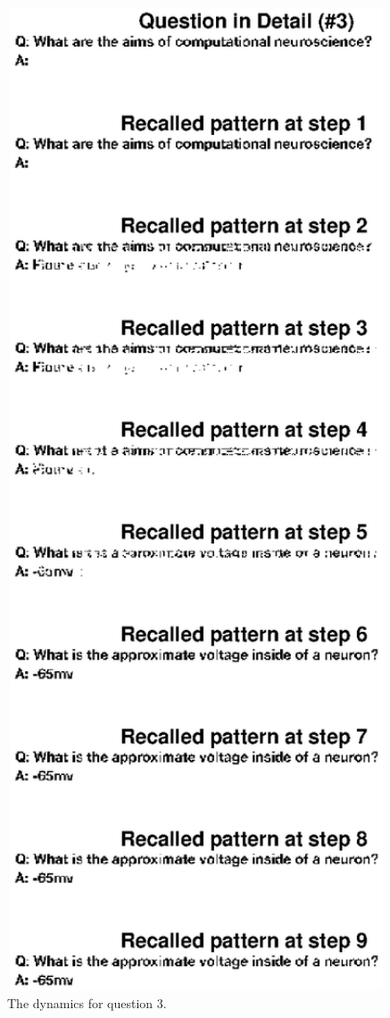 \documentclass[11pt, oneside]{article}
\begin{document}
\begin{figure}[H]
  \includegraphics[width=1\textwidth]{q3detail.eps}
  \caption{The dynamics for question 3.}
  \label{fig:q3detail}
  \end{figure}
\end{document}
